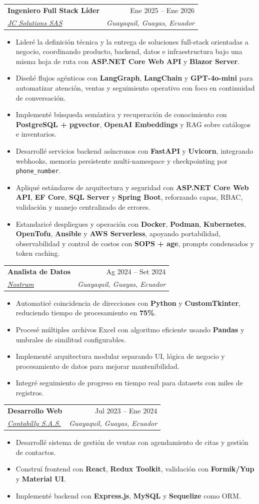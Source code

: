 \documentclass[a4paper,11pt]{article}
\makeatletter
\newcommand{\resumeItem}[1]{
  \item\small{#1}
}
\newcommand{\resumeItemListStart}{\begin{itemize}[rightmargin=0.11in]}
\newcommand{\resumeItemListEnd}{\end{itemize}}
\newcommand{\resumeQuadHeading}[4]{
  \item
  \begin{tabular*}{0.96\textwidth}[t]{l@{\extracolsep{\fill}}r}
    \textbf{#1} & #2 \\
    \textit{\small#3} & \textit{\small #4} \\
  \end{tabular*}
}
\makeatother
\begin{document}
\resumeQuadHeading{Ingeniero Full Stack Líder}{Ene 2025 -- Ene 2026}
{\href{https://jcsolut.com/}{\uline{JC Solutions SAS}}}{Guayaquil, Guayas, Ecuador}
\resumeItemListStart{}
\resumeItem{Lideré la definición técnica y la entrega de soluciones full-stack orientadas a negocio, coordinando producto, backend, datos e infraestructura bajo una misma hoja de ruta con \textbf{ASP.NET Core Web API} y \textbf{Blazor Server}.}
\resumeItem{Diseñé flujos agénticos con \textbf{LangGraph}, \textbf{LangChain} y \textbf{GPT-4o-mini} para automatizar atención, ventas y seguimiento operativo con foco en continuidad de conversación.}
\resumeItem{Implementé búsqueda semántica y recuperación de conocimiento con \textbf{PostgreSQL + pgvector}, \textbf{OpenAI Embeddings} y RAG sobre catálogos e inventarios.}
\resumeItem{Desarrollé servicios backend asíncronos con \textbf{FastAPI} y \textbf{Uvicorn}, integrando webhooks, memoria persistente multi-namespace y checkpointing por \texttt{phone\_number}.}
\resumeItem{Apliqué estándares de arquitectura y seguridad con \textbf{ASP.NET Core Web API}, \textbf{EF Core}, \textbf{SQL Server} y \textbf{Spring Boot}, reforzando capas, RBAC, validación y manejo centralizado de errores.}
\resumeItem{Estandaricé despliegues y operación con \textbf{Docker}, \textbf{Podman}, \textbf{Kubernetes}, \textbf{OpenTofu}, \textbf{Ansible} y \textbf{AWS Serverless}, apoyando portabilidad, observabilidad y control de costos con \textbf{SOPS + age}, prompts condensados y token caching.}
\resumeItemListEnd{}

\resumeQuadHeading{Analista de Datos}{Ag 2024 -- Set 2024}
{\href{https://www.guayaquil.gob.ec/}{\uline{Nostrum}}}{Guayaquil, Guayas, Ecuador}
\resumeItemListStart{}
\resumeItem{Automaticé coincidencia de direcciones con \textbf{Python} y \textbf{CustomTkinter}, reduciendo tiempo de procesamiento en \textbf{75\%}.}
\resumeItem{Procesé múltiples archivos Excel con algoritmo eficiente usando \textbf{Pandas} y umbrales de similitud configurables.}
\resumeItem{Implementé arquitectura modular separando UI, lógica de negocio y procesamiento de datos para mejorar mantenibilidad.}
\resumeItem{Integré seguimiento de progreso en tiempo real para datasets con miles de registros.}
\resumeItemListEnd{}

\resumeQuadHeading{Desarrollo Web}{Jul 2023 -- Ene 2024}
{\href{https://contabilly.com}{\uline{Contabilly S.A.S.}}}{Guayaquil, Guayas, Ecuador}
\resumeItemListStart{}
\resumeItem{Desarrollé sistema de gestión de ventas con agendamiento de citas y gestión de contactos.}
\resumeItem{Construí frontend con \textbf{React}, \textbf{Redux Toolkit}, validación con \textbf{Formik/Yup} y \textbf{Material UI}.}
\resumeItem{Implementé backend con \textbf{Express.js}, \textbf{MySQL} y \textbf{Sequelize} como ORM.}
\resumeItemListEnd{}
\end{document}
